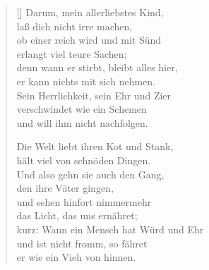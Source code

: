 \begin{multicols}{2}
\begin{verse}[\versewidth]
 Darum, mein allerliebstes Kind,\\
laß dich nicht irre machen,\\
ob einer reich wird und mit Sünd\\
erlangt viel teure Sachen;\\
denn wann er stirbt, bleibt alles hier,\\
er kann nichts mit sich nehmen.\\
Sein Herrlichkeit, sein Ehr und Zier\\
verschwindet wie ein Schemen\\
und will ihm nicht nachfolgen.

 Die Welt liebt ihren Kot und Stank,\\
hält viel von schnöden Dingen.\\
Und also gehn sie auch den Gang,\\
den ihre Väter gingen,\\
und sehen hinfort nimmermehr\\
das Licht, das uns ernähret;\\
kurz: Wann ein Mensch hat Würd und Ehr\\
und ist nicht fromm, so fähret\\
er wie ein Vieh von hinnen.

\end{verse}
\end{multicols}
